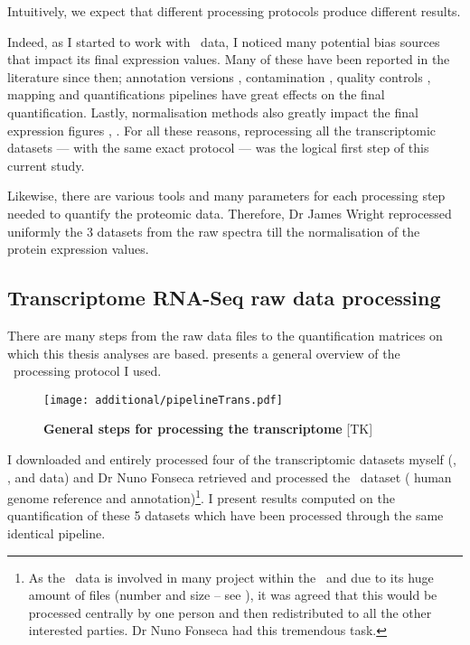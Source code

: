 Intuitively, we expect that different processing protocols produce
different results.

Indeed, as I started to work with \Rnaseq\ data, I noticed many potential bias
sources that impact its final expression values. Many of these have been
reported in the literature since then;
annotation versions ,
contamination ,
quality controls ,
mapping and quantifications pipelines 
have great effects on the final quantification. Lastly, normalisation
methods also greatly impact the final expression figures
, . For all these reasons,
reprocessing all the transcriptomic datasets --- with the same exact protocol ---
was the logical first step of this current study.

Likewise, there are various tools and many parameters for each processing step
needed to quantify the proteomic data. Therefore, Dr James Wright reprocessed
uniformly the 3 datasets from the raw spectra till the normalisation of the
protein expression values.

\subsection{Transcriptome RNA-Seq raw data processing}

There are many steps from the raw data files to the quantification matrices
on which this thesis analyses are based.  presents a
general overview of the \Rnaseq\ processing protocol I used.

\begin{figure}
    \texttt{[image: additional/pipelineTrans.pdf]}\centering
    \caption[General steps for processing the transcriptomic
    data]{\label{fig:pipelineTrans}\textbf{General steps for processing the
    transcriptome} [TK]}
\end{figure}

I downloaded and entirely processed four of the transcriptomic datasets
myself (, ,  and 
data) and Dr Nuno Fonseca retrieved and processed the \Gtex\ dataset (
human genome reference and  annotation)\footnote{As
the \Gtex\ data is involved in many project within the \EBI\
and due to its huge amount of files (number and  size -- see ),
it was agreed that this would be processed centrally by one person and then
redistributed to all the other interested parties. Dr Nuno Fonseca had this
tremendous task.}. I present results computed on the quantification of these
5 datasets which have been processed through the same identical pipeline.


